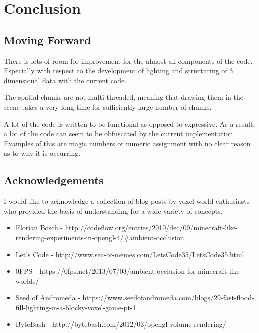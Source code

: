 \documentclass{book}
\begin{document}

\chapter{Conclusion}
\section{Moving Forward}
There is lots of room for improvement for the almost all components of the code.  Especially with respect to the development of lighting and structuring of 3 dimensional data with the current code.

The spatial chunks are not multi-threaded, meaning that drawing them in the scene takes a very long time for sufficiently large number of chunks.
      
A lot of the code is written to be functional as opposed to expressive.  As a result, a lot of the code can seem to be obfuscated by the current implementation.  Examples of this are magic numbers or numeric assignment with no clear reason as to why it is occurring.  

\section{Acknowledgements}
I would like to acknowledge a collection of blog posts by voxel world enthusiasts who provided the basis of understanding for a wide variety of concepts.

\begin{itemize}
	\item Florian Bösch - \url{http://codeflow.org/entries/2010/dec/09/minecraft-like-rendering-experiments-in-opengl-4/#ambient-occlusion}
	\item Let's Code - http://www.sea-of-memes.com/LetsCode35/LetsCode35.html
	\item 0FPS - https://0fps.net/2013/07/03/ambient-occlusion-for-minecraft-like-worlds/
	\item Seed of Andromeda - https://www.seedofandromeda.com/blogs/29-fast-flood-fill-lighting-in-a-blocky-voxel-game-pt-1
	\item ByteBash - http://bytebash.com/2012/03/opengl-volume-rendering/
\end{itemize}

\end{document}
